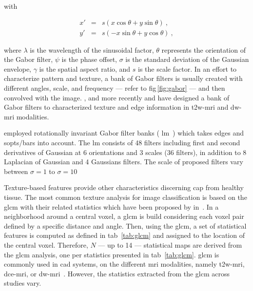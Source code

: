 \noindent with 

\begin{eqnarray}
	x' & = & s\left( x \cos \theta + y \sin \theta \right) \ , \nonumber \\
	y' & = & s \left( - x \sin \theta + y \cos \theta \right) \ , \nonumber
\end{eqnarray}

\noindent where $\lambda$ is the wavelength of the sinusoidal factor, $\theta$ represents the orientation of the Gabor filter, $\psi$ is the phase offset, $\sigma$ is the standard deviation of the Gaussian envelope, $\gamma$ is the spatial aspect ratio, and $s$ is the scale factor.
In an effort to characterize pattern and texture, a bank of Gabor filters is usually created with different angles, scale, and frequency --- refer to \acs{fig}\,\ref{fig:gabor} --- and then convolved with the image.
\citeauthor{Viswanath2012}, \citeauthor{Tiwari2012} and more recently \citeauthor{khalvati2015automated} and \citeauthor{chung2015prostate} have designed a bank of Gabor filters to characterized texture and edge information in \ac{t2w}-\ac{mri} and \ac{dw}-\ac{mri} modalities.

\citeauthor{rampun2016computer} employed rotationally invariant Gabor filter banks ( \ac{lm}~\cite{varma2005statistical}) which takes edges and sopts/bars into account. 
The \ac{lm} consists of 48 filters including first and second derivatives of Gaussian at 6 orientations and 3 scales (36 filters), in addition to 8 Laplacian of Gaussian and 4 Gaussians filters.
The scale of proposed filters vary between $\sigma = 1$ to $\sigma = 10$ \si{\px}


Texture-based features provide other characteristics discerning \ac{cap} from healthy tissue.
The most common texture analysis for image classification is based on the \ac{glcm} with their related statistics which have been proposed by \citeauthor{Haralick1973} in~\cite{Haralick1973}.
In a neighborhood around a central voxel, a \ac{glcm} is build considering each voxel pair defined by a specific distance and angle.
Then, using the \ac{glcm}, a set of statistical features is computed as defined in \acs{tab}~\ref{tab:glcm} and assigned to the location of the central voxel.
Therefore, $N$ --- up to 14 --- statistical maps are derived from the \ac{glcm} analysis, one per statistics presented in \acs{tab}~\ref{tab:glcm}.
\ac{glcm} is commonly used in \ac{cad} systems, on the different \ac{mri} modalities, namely \ac{t2w}-\ac{mri}, \ac{dce}-\ac{mri}, or \ac{dw}-\ac{mri}~\cite{Antic2013,Niaf2011,Niaf2012,Tiwari2009a,Tiwari2010,Tiwari2013,Viswanath2008,Viswanath2009,Viswanath2011,Viswanath2012,trigui2016classification,rampun2015computer,rampun2016computer,rampun2016quantitative,cameron2014multiparametric,cameron2016maps,khalvati2015automated,chung2015prostate,lehaire2014computer}.
However, the statistics extracted from the \ac{glcm} across studies vary.

